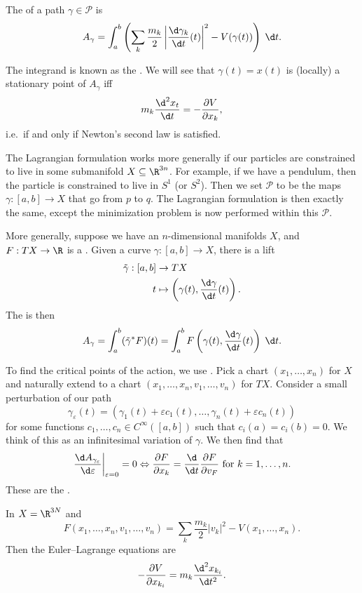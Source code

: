 \documentclass[a4paper]{article}
\begin{document}
\begin{defi}[Action]
  The  of a path $\gamma \in \mathcal{P}$ is
  \[
    A_\gamma = \int_a^b \left(\sum_k \frac{m_k}{2} \left|\frac{\d \gamma_k}{\d t}(t) \right|^2 - V(\gamma(t))\right)\;\d t.
  \]
\end{defi}
The integrand is known as the . We will see that $\gamma(t) = x(t)$ is (locally) a stationary point of $A_\gamma$ iff
\[
  m_k \frac{\d^2 x_t}{\d t} = - \frac{\partial V}{\partial x_k},
\]
i.e.\ if and only if Newton's second law is satisfied.

The Lagrangian formulation works more generally if our particles are constrained to live in some submanifold $X \subseteq \R^{3n}$. For example, if we have a pendulum, then the particle is constrained to live in $S^1$ (or $S^2$). Then we set $\mathcal{P}$ to be the maps $\gamma: [a, b] \to X$ that go from $p$ to $q$. The Lagrangian formulation is then exactly the same, except the minimization problem is now performed within this $\mathcal{P}$.

More generally, suppose we have an $n$-dimensional manifolds $X$, and $F: TX \to \R$ is a . Given a curve $\gamma: [a, b] \to X$, there is a lift
\begin{align*}
  \tilde{\gamma}: [a, b] &\to TX\\
  t &\mapsto \left(\gamma(t), \frac{\d \gamma}{\d t}(t)\right).
\end{align*}
The  is then
\[
  A_\gamma = \int_a^b (\tilde{\gamma}^* F)(t) = \int_a^b F\left(\gamma(t), \frac{\d \gamma}{\d t}(t)\right) \;\d t.
\]

To find the critical points of the action, we use . Pick a chart $(x_1, \ldots, x_n)$ for $X$ and naturally extend to a chart $(x_1, \ldots, x_n, v_1, \ldots, v_n)$ for $TX$. Consider a small perturbation of our path
\[
  \gamma_\varepsilon(t) = (\gamma_1(t) + \varepsilon c_1(t), \ldots, \gamma_n(t) + \varepsilon c_n(t))
\]
for some functions $c_1, \ldots, c_n \in C^\infty([a, b])$ such that $c_i(a) = c_i(b) = 0$. We think of this as an infinitesimal variation of $\gamma$. We then find that
\[
  \left.\frac{\d A_{\gamma_\varepsilon}}{\d \varepsilon} \right|_{\varepsilon = 0} = 0 \Leftrightarrow \frac{\partial F}{\partial x_k} = \frac{\d}{\d t} \frac{\partial F}{\partial v_F}\text{ for }k = 1, \ldots, n.
\]
These are the .

\begin{eg}
  In $X = \R^{3N}$ and
  \[
    F(x_1, \ldots, x_n, v_1, \ldots, v_n) = \sum_k \frac{m_k}{2} |v_k|^2 - V(x_1, \ldots, x_n).
  \]
  Then the Euler--Lagrange equations are
  \[
    -\frac{\partial V}{\partial x_{k_i}} = m_k \frac{\d^2 x_{k_i}}{\d t^2}.
  \]
\end{eg}
\end{document}

